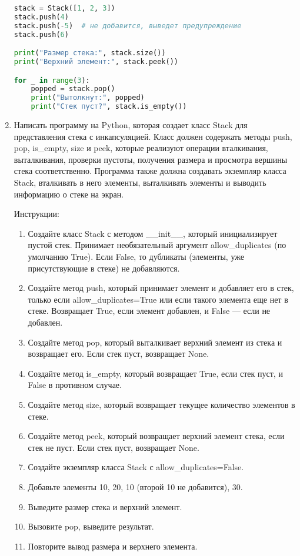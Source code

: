 \begin{enumerate}
\begin{lstlisting}[language=Python]
stack = Stack([1, 2, 3])
stack.push(4)
stack.push(-5)  # не добавится, выведет предупреждение
stack.push(6)

print("Размер стека:", stack.size())
print("Верхний элемент:", stack.peek())

for _ in range(3):
    popped = stack.pop()
    print("Вытолкнут:", popped)
    print("Стек пуст?", stack.is_empty())
\end{lstlisting}

\item Написать программу на Python, которая создает класс Stack для представления стека с инкапсуляцией. Класс должен содержать методы push, pop, is\_empty, size и peek, которые реализуют операции вталкивания, выталкивания, проверки пустоты, получения размера и просмотра вершины стека соответственно. Программа также должна создавать экземпляр класса Stack, вталкивать в него элементы, выталкивать элементы и выводить информацию о стеке на экран.

Инструкции:
\begin{enumerate}
    \item Создайте класс Stack с методом \_\_init\_\_, который инициализирует пустой стек. Принимает необязательный аргумент allow\_duplicates (по умолчанию True). Если False, то дубликаты (элементы, уже присутствующие в стеке) не добавляются.
    \item Создайте метод push, который принимает элемент и добавляет его в стек, только если allow\_duplicates=True или если такого элемента еще нет в стеке. Возвращает True, если элемент добавлен, и False — если не добавлен.
    \item Создайте метод pop, который выталкивает верхний элемент из стека и возвращает его. Если стек пуст, возвращает None.
    \item Создайте метод is\_empty, который возвращает True, если стек пуст, и False в противном случае.
    \item Создайте метод size, который возвращает текущее количество элементов в стеке.
    \item Создайте метод peek, который возвращает верхний элемент стека, если стек не пуст. Если стек пуст, возвращает None.
    \item Создайте экземпляр класса Stack с allow\_duplicates=False.
    \item Добавьте элементы 10, 20, 10 (второй 10 не добавится), 30.
    \item Выведите размер стека и верхний элемент.
    \item Вызовите pop, выведите результат.
    \item Повторите вывод размера и верхнего элемента.
\end{enumerate}


\end{enumerate}
